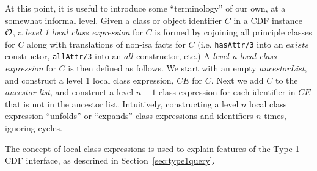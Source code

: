 At this point, it is useful to introduce some ``terminology'' of our
own, at a somewhat informal level.  Given a class or object identifier
$C$ in a CDF instance ${\cal O}$, a {\em level 1 local class expression}
for $C$ is formed by cojoining all principle classes for $C$ along
with translations of non-isa facts for $C$ (i.e. {\tt hasAttr/3} into
an $exists$ constructor, {\tt allAttr/3} into an $all$ constructor,
etc.)  A {\em level n local class expression} for $C$ is then defined
as follows.  We start with an empty {\em ancestorList}, and construct
a level 1 local class expression, $CE$ for $C$.  Next we add $C$ to
the {\em ancestor list}, and construct a level $n-1$ class expression
for each identifier in $CE$ that is not in the ancestor list.
Intuitively, constructing a level $n$ local class expression
``unfolds'' or ``expands'' class expressions and identifiers $n$
times, ignoring cycles.  

The concept of local class expressions is used to explain features of
the Type-1 CDF interface, as descrined in
Section~\ref{sec:type1query}.
